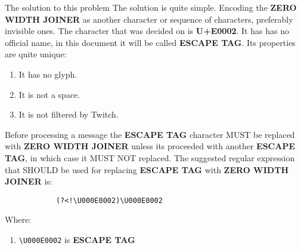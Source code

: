 \documentclass[a4paper]{article}
\newcommand\ESCAPE{\textbf{ESCAPE TAG}}
\newcommand\ZWJ{\textbf{ZERO WIDTH JOINER}}
\begin{document}
    \begin{section}{The solution to this problem}
        The solution is quite simple. Encoding the \ZWJ{} as another character or
        sequence of characters, preferably invisible ones. The character that
        was decided on is \textbf{U+E0002}. It has has no official name, in
        this document it will be called \ESCAPE{}. Its properties are quite
        unique:
        \begin{enumerate}
            \item It has no glyph.
            \item It is not a space.
            \item It is not filtered by Twitch.
        \end{enumerate}
        Before processing a message the \ESCAPE{} character MUST be replaced
        with \ZWJ{} unless its proceeded with another \ESCAPE{}, in which case
        it MUST NOT replaced. The suggested regular expression that SHOULD be
        used for replacing \ESCAPE{} with \ZWJ{} is:
        \begin{verbatim}
            (?<!\U000E0002)\U000E0002
        \end{verbatim}
        Where:
        \begin{enumerate}
            \item \verb`\U000E0002` is \ESCAPE{}
        \end{enumerate}
    \end{section}
\end{document}
